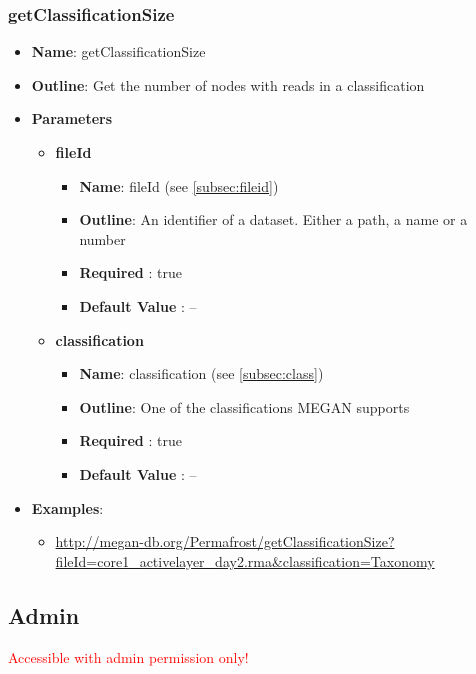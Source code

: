 \documentclass[11pt]{article}
\begin{document}
\subsubsection{getClassificationSize}
\begin{itemize}
	\item \textbf{Name}: getClassificationSize
	\item \textbf{Outline}: Get the number of nodes with reads in a classification
	\item \textbf{Parameters}
		\begin{itemize}
			\item \textbf{fileId}
				\begin{itemize}
					\item \textbf{Name}: fileId (see \ref{subsec:fileid})
					\item \textbf{Outline}: An identifier of a dataset. Either a path, a name or a number
					\item \textbf{Required} : true
					\item \textbf{Default Value} : --
				\end{itemize}
			\item \textbf{classification}
				\begin{itemize}
					\item \textbf{Name}: classification (see \ref{subsec:class})
					\item \textbf{Outline}: One of the classifications MEGAN supports
					\item \textbf{Required} : true
					\item \textbf{Default Value} : --
				\end{itemize}
		\end{itemize}
	\item \textbf{Examples}:
		\begin{itemize}
			\item \url{http://megan-db.org/Permafrost/getClassificationSize?fileId=core1_activelayer_day2.rma&classification=Taxonomy}
		\end{itemize}
\end{itemize}

\subsection{Admin}
\textcolor{red}{Accessible with admin permission only!}
\end{document}
